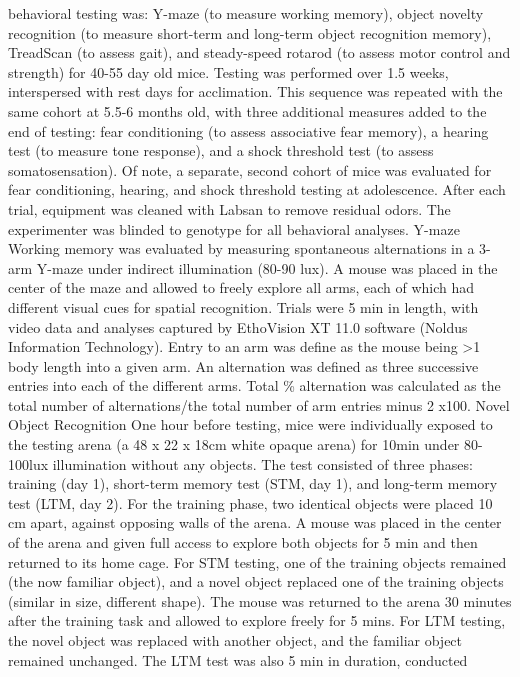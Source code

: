 behavioral testing was: Y-maze (to measure working memory), object novelty
recognition (to measure short-term and long-term object recognition memory),
TreadScan (to assess gait), and steady-speed rotarod (to assess motor control
and strength) for 40-55 day old mice. Testing was performed over 1.5 weeks,
interspersed with rest days for acclimation. This sequence was repeated with the
same cohort at 5.5-6 months old, with three additional measures added to the end
of testing: fear conditioning (to assess associative fear memory), a hearing
test (to measure tone response), and a shock threshold test (to assess
somatosensation). Of note, a separate, second cohort of mice was evaluated for
fear conditioning, hearing, and shock threshold testing at adolescence. After
each trial, equipment was cleaned with Labsan to remove residual odors. The
experimenter was blinded to genotype for all behavioral analyses.
Y-maze
Working memory was evaluated by measuring spontaneous alternations in a 3-arm
Y-maze under indirect illumination (80-90 lux). A mouse was placed in the center
of the maze and allowed to freely explore all arms, each of which had different
visual cues for spatial recognition. Trials were 5 min in length, with video
data and analyses captured by EthoVision XT 11.0 software (Noldus Information
Technology). Entry to an arm was define as the mouse being >1 body length into a
given arm. An alternation was defined as three successive entries into each of
the different arms. Total \% alternation was calculated as the total number of
alternations/the total number of arm entries minus 2 x100. 
Novel Object Recognition
One hour before testing, mice were individually exposed to the testing arena (a
48 x 22 x 18cm white opaque arena) for 10min under 80-100lux illumination
without any objects. The test consisted of three phases: training (day 1),
short-term memory test (STM, day 1), and long-term memory test (LTM, day 2). For
the training phase, two identical objects were placed 10 cm apart, against
opposing walls of the arena. A mouse was placed in the center of the arena and
given full access to explore both objects for 5 min and then returned to its
home cage. For STM testing, one of the training objects remained (the now
familiar object), and a novel object replaced one of the training objects
(similar in size, different shape). The mouse was returned to the arena 30
minutes after the training task and allowed to explore freely for 5 mins. For
LTM testing, the novel object was replaced with another object, and the familiar
object remained unchanged. The LTM test was also 5 min in duration, conducted
